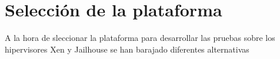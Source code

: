 \chapter{Selección de la plataforma}

A la hora de sleccionar la plataforma para desarrollar las pruebas sobre los hipervisores Xen y Jailhouse se han barajado diferentes alternativas 
